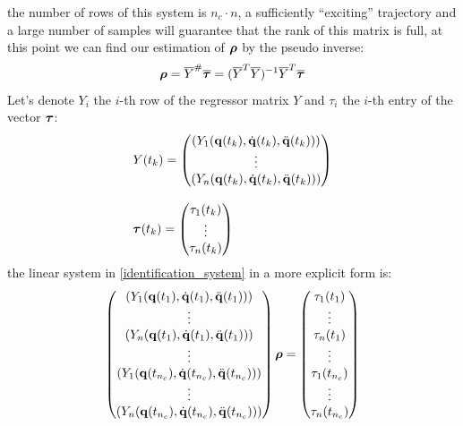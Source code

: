 \documentclass[10pt, a4paper]{report}
\newcommand{\q}{{\mathbf q}}
\begin{document}
the number of rows of this system is $n_c\cdot n$, a sufficiently ``exciting'' trajectory and a large number of samples will guarantee that the rank of this matrix is full, at this point we can find our estimation of ${\boldsymbol{\rho}}$ by the pseudo inverse:\begin{equation}
    {\boldsymbol{\rho}} = \overline{Y}^\#\overline{{\boldsymbol{\tau}}}=(\overline Y^T\overline Y)^{-1}\overline Y^T\overline{{\boldsymbol{\tau}}} 
\end{equation}
Let's denote $Y_i$ the $i$-th row of the regressor matrix $Y$ and $\tau_i$ the $i$-th entry of the vector ${\boldsymbol{\tau}}$:\begin{align}
    &Y(t_k)=\begin{pmatrix}
        (Y_1(\q(t_k),\dq(t_k),\ddq(t_k)))\\ 
        \vdots \\ 
         (Y_n(\q(t_k),\dq(t_k),\ddq(t_k)))
    \end{pmatrix}\\[2ex]
    &\btau(t_k)=\begin{pmatrix}
        \tau_1(t_k)\\ \vdots \\ \tau_n(t_k)
    \end{pmatrix}
\end{align}
the linear system in \eqref{identification_system} in a more explicit form is:\begin{equation}
    \begin{pmatrix}
         (Y_1(\q(t_1),\dq(t_1),\ddq(t_1)))\\ 
        \vdots \\ 
         (Y_n(\q(t_1),\dq(t_1),\ddq(t_1)))\\ \vdots \\ 
         (Y_1(\q(t_{n_c}),\dq(t_{n_c}),\ddq(t_{n_c})))\\ 
        \vdots \\ 
         (Y_n(\q(t_{n_c}),\dq(t_{n_c}),\ddq(t_{n_c})))
    \end{pmatrix}\brho=\begin{pmatrix}
        \tau_1(t_1)\\ \vdots \\ \tau_n(t_1) \\ \vdots \\ \tau_1(t_{n_c})\\ \vdots \\ \tau_n(t_{n_c})
    \end{pmatrix}
\end{equation}
\end{document}
